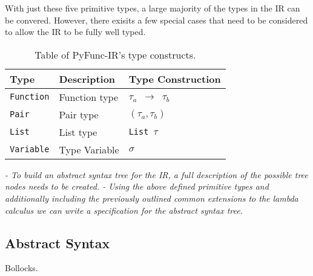 \documentclass{l4proj}
\begin{document}
With just these five primitive types, a large majority of the types in the IR can be convered.
However, there exisits a few special cases that need to be considered to allow the IR to be fully well typed.

\begin{table}[h]
\caption{Table of PyFunc-IR's type constructs.}
\begin{center}
\begin{tabular}{@{}|l|l|l|@{}}
    \hline
    \textbf{Type}        & \textbf{Description}      & \textbf{Type Construction}  \\
    \hline
    \texttt{Function}    & Function type             & \texttt{$\tau_a$ $\rightarrow$ $\tau_b$} \\
    \texttt{Pair}        & Pair type                 & \texttt{$(\tau_a, \tau_b)$} \\
    \texttt{List}        & List type                 & \texttt{List $\tau$} \\
    \texttt{Variable}    & Type Variable             & \texttt{$\sigma$} \\
    \hline
\end{tabular}
\end{center}
\end{table}

\emph{- To build an abstract syntax tree for the IR, a full description of the possible tree nodes needs to be created.
- Using the above defined primitive types and additionally including the previously outlined common extensions to the lambda calculus we can write a specification for the abstract syntax tree.}

\subsection*{Abstract Syntax}

Bollocks.
\end{document}
